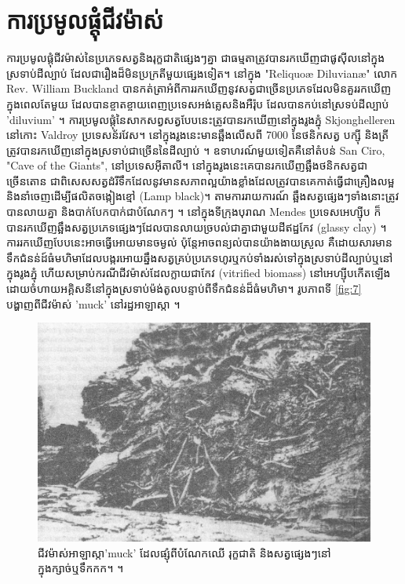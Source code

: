 \documentclass[10pt,twocolumn,letterpaper]{article}
\begin{document}
\section{ការប្រមូលផ្ដុំជីវម៉ាស់}

ការប្រមូលផ្តុំជីវម៉ាស់នៃប្រភេទសត្វនិងរុក្ខជាតិផ្សេងៗគ្នា ជាធម្មតាត្រូវបានរកឃើញជាផូសុីលនៅក្នុងស្រទាប់ដីល្បាប់ ដែលជារឿងដ៏មិនប្រក្រតីមួយផ្សេងទៀត។ នៅក្នុង "Reliquoæ Diluvianæ" លោក Rev. William Buckland បានកត់ត្រាអំពីការរកឃើញនូវសត្វជាច្រើនប្រភេទដែលមិនគួររកឃើញក្នុងពេលតែមួយ ដែលបានខ្ចាតខ្ចាយពេញប្រទេសអង់គ្លេសនិងអឺរ៉ុប ដែលបានកប់នៅស្រទប់ដីល្បាប់ 'diluvium' \cite{58}។ ការប្រមូលផ្តុំនៃសាកសព្វសត្វបែបនេះត្រូវបានរកឃើញនៅក្នុងរូងភ្នុំ Skjonghelleren នៅកោះ Valdroy ប្រទេសន័រវែស។ នៅក្នុងរូងនេះមានឆ្អឹងលើសពី 7000 នៃថនិកសត្វ បក្សុី និងត្រី ត្រូវបានរកឃើញនៅក្នុងស្រទាប់ជាច្រើននៃដីល្បាប់ \cite{59}។ ឧទាហរណ៍មួយទៀតគឺនៅតំបន់ San Ciro, "Cave of the Giants", នៅប្រទេសអ៊ីតាលី។ នៅក្នុងរូងនេះគេបានរកឃើញឆ្អឹងថនិកសត្វជាច្រើនតោន ជាពិសេសសត្វដំរីទឹកដែលនូវមានសភាពល្អយ៉ាងខ្លាំងដែលត្រូវបានគេកាត់ធ្វើជាគ្រឿងលម្អ និងនាំចេញដើម្បីផលិតចង្កៀងខ្មៅ (Lamp black)។ តាមការរាយការណ៍ ឆ្អឹងសត្វផ្សេងៗទាំងនោះត្រូវបានលាយគ្នា និងបាក់បែកបាក់ជាបំណែកៗ \cite{60,61}។ នៅក្នុងទីក្រុងបុរាណ Mendes ប្រទេសអេហ្ស៊ីប ក៏បានរកឃើញឆ្អឹងសត្វប្រភេទផ្សេងៗដែលបានលាយច្របល់ជាគ្នាជាមួយដីឥដ្ឋកែវ (glassy clay) \cite{57}។ ការរកឃើញបែបនេះអាចធ្វើអោយមានចម្ងល់ ប៉ុន្តែអាចពន្យល់បានយ៉ាងងាយស្រួល គឺដោយសារមានទឹកជំនន់ដ៍ធំមហិមាដែលបង្ករអោយឆ្នឹងសត្វគ្រប់ប្រភេទហូរឬកប់ទាំងរស់ទៅក្នុងស្រទាប់ដីល្បាប់ឬនៅក្នុងរូងភ្នុំ ហើយសម្រាប់ករណីជីវម៉ាស់ដែលក្លាយជាកែវ (vitrified biomass) នៅអេហ្ស៊ីបកើតឡើងដោយចំហាយអគ្គិសនីនៅក្នុងស្រទាប់ម៉ង់តូលបន្ទាប់ពីទឹកជំនន់ដ៏ធំមហិមា។ រូបភាពទី \ref{fig:7} បង្ហាញពីជីវម៉ាស់ 'muck' នៅរដ្ឋអាឡាស្កា \cite{56}។

\begin{figure}[t]
\begin{center}
   \includegraphics[width=1\linewidth]{muck-crop.jpeg}
\end{center}
   \caption{ជីវម៉ាស់អាឡាស្កា'muck' ដែលផ្សុំពីបំណែកឈើ រុក្ខជាតិ និងសត្វផ្សេងៗនៅក្នុងក្សាច់ឬទឹកកក។ \cite{146}។}
\label{fig:7}
\label{fig:onecol}
\end{figure}
\end{document}
